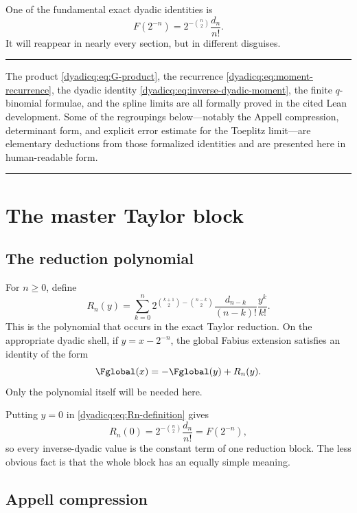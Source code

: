 \documentclass[11pt,oneside]{article}
\theoremstyle{definition}
\theoremstyle{remark}
\newenvironment{boxedremark}{%
  \par\smallskip\noindent\begin{center}\begin{minipage}{0.94\textwidth}%
  \color{black}\hrule\vspace{0.6em}\small
}{%
  \vspace{0.6em}\hrule\end{minipage}\end{center}\smallskip
}
\begin{document}
One of the fundamental exact dyadic identities is
\begin{equation}\label{dyadicq:eq:inverse-dyadic-moment}
  F(2^{-n})=2^{-\binom n2}\frac{d_n}{n!}.
\end{equation}
It will reappear in nearly every section, but in different disguises.

\begin{boxedremark}
The product \eqref{dyadicq:eq:G-product}, the recurrence
\eqref{dyadicq:eq:moment-recurrence}, the dyadic identity
\eqref{dyadicq:eq:inverse-dyadic-moment}, the finite $q$-binomial formulae, and the
spline limits are all formally proved in the cited Lean development.  Some of
the regroupings below---notably the Appell compression, determinant form, and
explicit error estimate for the Toeplitz limit---are elementary deductions
from those formalized identities and are presented here in human-readable
form.
\end{boxedremark}

\section{The master Taylor block}

\subsection{The reduction polynomial}

For $n\ge0$, define
\begin{equation}\label{dyadicq:eq:Rn-definition}
 R_n(y)=
 \sum_{k=0}^{n}
 2^{\binom{k+1}{2}-\binom{n-k}{2}}
 \frac{d_{n-k}}{(n-k)!}\frac{y^k}{k!}.
\end{equation}
This is the polynomial that occurs in the exact Taylor reduction.  On the
appropriate dyadic shell, if $y=x-2^{-n}$, the global Fabius extension satisfies
an identity of the form
\[
  \Fglobal(x)=-\Fglobal(y)+R_n(y).
\]
Only the polynomial itself will be needed here.

Putting $y=0$ in \eqref{dyadicq:eq:Rn-definition} gives
\[
  R_n(0)=2^{-\binom n2}\frac{d_n}{n!}=F(2^{-n}),
\]
so every inverse-dyadic value is the constant term of one reduction block.
The less obvious fact is that the whole block has an equally simple meaning.

\subsection{Appell compression}
\end{document}
